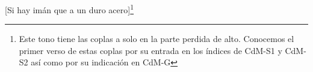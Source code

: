 {[}Si hay imán que a un duro acero{]}\footnote{\textsuperscript{}Este tono tiene las coplas a solo en la parte perdida de alto. Conocemos el primer verso de estas coplas por su entrada en los índices de CdM-S1 y CdM-S2 así como por su indicación en CdM-G}

